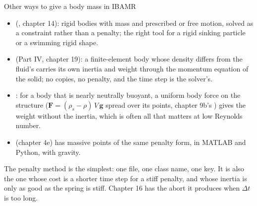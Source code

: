 \documentclass[aspectratio=169,11pt]{beamer}
\begin{document}
\begin{frame}{Other ways to give a body mass in IBAMR}
\label{fr:other}
\small
\begin{itemize}
  \item {} (, chapter 14): rigid bodies with mass and prescribed or free motion, solved as a constraint rather than a penalty; the right tool for a rigid sinking particle or a swimming rigid shape.
  \item {} (Part IV, chapter 19): a finite-element body whose density differs from the fluid's carries its own inertia and weight through the momentum equation of the solid; no copies, no penalty, and the time step is the solver's.
  \item {}: for a body that is nearly neutrally buoyant, a uniform body force on the structure ($\mathbf{F} = (\rho_s - \rho)\,V\,\mathbf{g}$ spread over its points, chapter 9b's ) gives the weight without the inertia, which is often all that matters at low Reynolds number.
  \item {} (chapter 4e) has massive points of the same penalty form, in MATLAB and Python, with gravity.
\end{itemize}
\vspace{1mm}
\begin{punchbox}
\footnotesize The penalty method is the simplest: one file, one class name, one key. It is also the one whose cost is a shorter time step for a stiff penalty, and whose inertia is only as good as the spring is stiff. Chapter 16 has the abort it produces when $\Delta t$ is too long.
\end{punchbox}
\end{frame}
\end{document}
